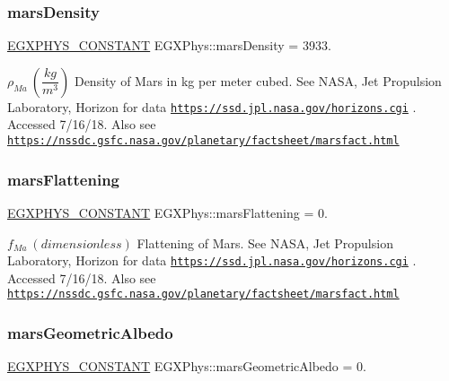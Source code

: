 \subsubsection{\texorpdfstring{mars\+Density}{marsDensity}}
{\footnotesize\ttfamily \mbox{\hyperlink{group___e_g_x_phys-_constants-_macros_ga76980d288494ce1714c9ac68a95ba702}{E\+G\+X\+P\+H\+Y\+S\+\_\+\+C\+O\+N\+S\+T\+A\+NT}} E\+G\+X\+Phys\+::mars\+Density = 3933.}

$\rho_{Ma} \ (\dfrac{kg}{m^3})$ Density of Mars in kg per meter cubed. See N\+A\+SA, Jet Propulsion Laboratory, Horizon for data \href{https://ssd.jpl.nasa.gov/horizons.cgi}{\tt https\+://ssd.\+jpl.\+nasa.\+gov/horizons.\+cgi} . Accessed 7/16/18. Also see \href{https://nssdc.gsfc.nasa.gov/planetary/factsheet/marsfact.html}{\tt https\+://nssdc.\+gsfc.\+nasa.\+gov/planetary/factsheet/marsfact.\+html} \mbox{\label{group___e_g_x_phys-_constants-_astrophysics-_solar_system-_mars-_bulk_ga4964bcdb2b94b7df3e3f5c251dfc6501}} 
\subsubsection{\texorpdfstring{mars\+Flattening}{marsFlattening}}
{\footnotesize\ttfamily \mbox{\hyperlink{group___e_g_x_phys-_constants-_macros_ga76980d288494ce1714c9ac68a95ba702}{E\+G\+X\+P\+H\+Y\+S\+\_\+\+C\+O\+N\+S\+T\+A\+NT}} E\+G\+X\+Phys\+::mars\+Flattening = 0.}

$f_{Ma} \ (dimensionless)$ Flattening of Mars. See N\+A\+SA, Jet Propulsion Laboratory, Horizon for data \href{https://ssd.jpl.nasa.gov/horizons.cgi}{\tt https\+://ssd.\+jpl.\+nasa.\+gov/horizons.\+cgi} . Accessed 7/16/18. Also see \href{https://nssdc.gsfc.nasa.gov/planetary/factsheet/marsfact.html}{\tt https\+://nssdc.\+gsfc.\+nasa.\+gov/planetary/factsheet/marsfact.\+html} \mbox{\label{group___e_g_x_phys-_constants-_astrophysics-_solar_system-_mars-_bulk_gaf8793cdbb717f966e968edc2d443bdee}} 
\subsubsection{\texorpdfstring{mars\+Geometric\+Albedo}{marsGeometricAlbedo}}
{\footnotesize\ttfamily \mbox{\hyperlink{group___e_g_x_phys-_constants-_macros_ga76980d288494ce1714c9ac68a95ba702}{E\+G\+X\+P\+H\+Y\+S\+\_\+\+C\+O\+N\+S\+T\+A\+NT}} E\+G\+X\+Phys\+::mars\+Geometric\+Albedo = 0.}

